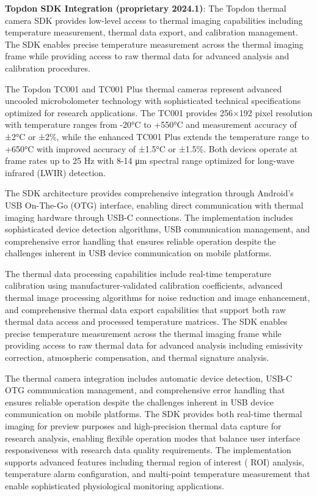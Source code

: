 \documentclass[12pt,a4paper]{article}
\begin{document}
\textbf{Topdon SDK Integration (proprietary 2024.1)}: The Topdon thermal camera SDK provides low-level access to thermal
imaging capabilities including temperature measurement, thermal data export, and calibration management. The SDK enables
precise temperature measurement across the thermal imaging frame while providing access to raw thermal data for advanced
analysis and calibration procedures.

The Topdon TC001 and TC001 Plus thermal cameras represent advanced uncooled microbolometer technology with sophisticated
technical specifications optimized for research applications. The TC001 provides 256×192 pixel resolution with
temperature ranges from -20°C to +550°C and measurement accuracy of ±2°C or ±2\%, while the enhanced TC001 Plus extends
the temperature range to +650°C with improved accuracy of ±1.5°C or ±1.5\%. Both devices operate at frame rates up to 25
Hz with 8-14 μm spectral range optimized for long-wave infrared (LWIR) detection.

The SDK architecture provides comprehensive integration through Android's USB On-The-Go (OTG) interface, enabling direct
communication with thermal imaging hardware through USB-C connections. The implementation includes sophisticated device
detection algorithms, USB communication management, and comprehensive error handling that ensures reliable operation
despite the challenges inherent in USB device communication on mobile platforms.

The thermal data processing capabilities include real-time temperature calibration using manufacturer-validated
calibration coefficients, advanced thermal image processing algorithms for noise reduction and image enhancement, and
comprehensive thermal data export capabilities that support both raw thermal data access and processed temperature
matrices. The SDK enables precise temperature measurement across the thermal imaging frame while providing access to raw
thermal data for advanced analysis including emissivity correction, atmospheric compensation, and thermal signature
analysis.

The thermal camera integration includes automatic device detection, USB-C OTG communication management, and
comprehensive error handling that ensures reliable operation despite the challenges inherent in USB device communication
on mobile platforms. The SDK provides both real-time thermal imaging for preview purposes and high-precision thermal
data capture for research analysis, enabling flexible operation modes that balance user interface responsiveness with
research data quality requirements. The implementation supports advanced features including thermal region of interest (
ROI) analysis, temperature alarm configuration, and multi-point temperature measurement that enable sophisticated
physiological monitoring applications.
\end{document}
